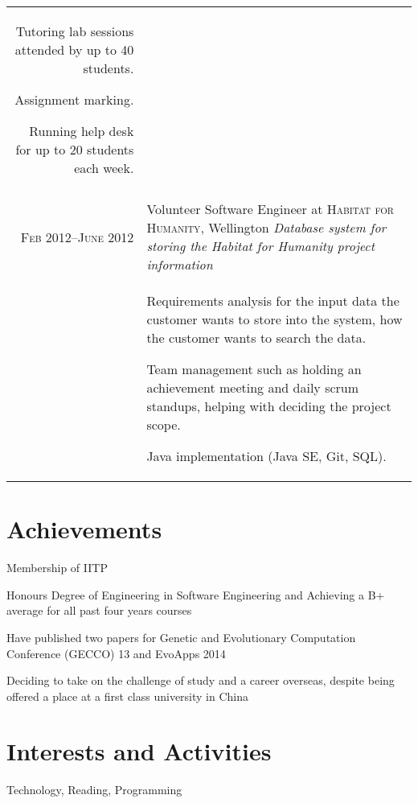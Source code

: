 \documentclass[a4paper,10pt]{article} %
\begin{document}
\begin{tabular}{r|p{11cm}}
{Tutoring lab sessions attended by up to 40 students.

Assignment marking.

Running help desk for up to 20 students each week.
}\\
\multicolumn{2}{c}{} \\


\textsc{Feb 2012–June 2012} & Volunteer Software Engineer at \textsc{Habitat for Humanity}, Wellington
 \emph{Database system for storing the Habitat for Humanity project information}\\
& \footnotesize{
Requirements analysis for the input data the customer wants to store into the system, how the customer wants to search the data.

Team management such as holding an achievement meeting and daily scrum standups, helping with deciding the project scope.

Java implementation (Java SE, Git, SQL).

}

\end{tabular}





\section{Achievements}

Membership of IITP

Honours Degree of Engineering in Software Engineering and Achieving a B+ average for all past four years courses

Have published two papers for Genetic and Evolutionary Computation Conference (GECCO) 13 and EvoApps 2014

Deciding to take on the challenge of study and a career overseas, despite being offered a place at a first class university in China


\section{Interests and Activities}
Technology, Reading, Programming
\end{document}
